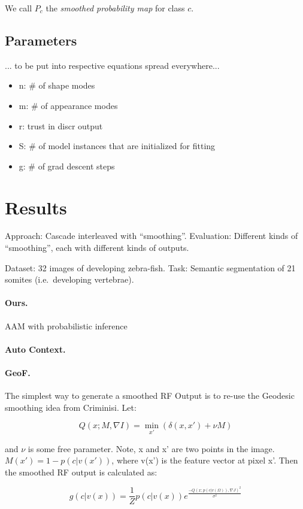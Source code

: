 \documentclass[10pt,twocolumn,letterpaper]{article}
\begin{document}
We call $P_c$ the \emph{smoothed probability map} for class $c$. 

\subsection{Parameters}
... to be put into respective equations spread everywhere...
\begin{itemize}
\item n: \# of shape modes
\item m: \# of appearance modes
\item r: trust in discr output
\item S: \# of model instances that are initialized for fitting
\item g: \# of grad descent steps
\end{itemize}

\section{Results}
Approach: Cascade interleaved with "`smoothing"'. 
Evaluation: Different kinds of "`smoothing"', each with different kinds of outputs.

Dataset: 32 images of developing zebra-fish. Task: Semantic segmentation of 21 somites (i.e.\ developing vertebrae).

\paragraph{Ours. }
AAM with probabilistic inference 

\paragraph{Auto Context. }

\paragraph{GeoF. }
The simplest way to generate a smoothed RF Output is to re-use the Geodesic smoothing idea from Criminisi.  Let:

\[ Q(x; M, \nabla I) = \min_{x'} (\delta (x,x') + \nu M) \]

and $\nu$ is some free parameter.  Note, x and x' are two points in the image. $M(x') = 1 - p(c|v(x'))$, where v(x') is the feature vector at pixel x'.  Then the smoothed RF output is calculated as:

\[ g(c|v(x)) = \frac{1}{Z} p(c|v(x)) e^{\frac{-Q(x;p(c|v(\Omega)),\nabla J)^2}{\sigma ^2}} \]
\end{document}
